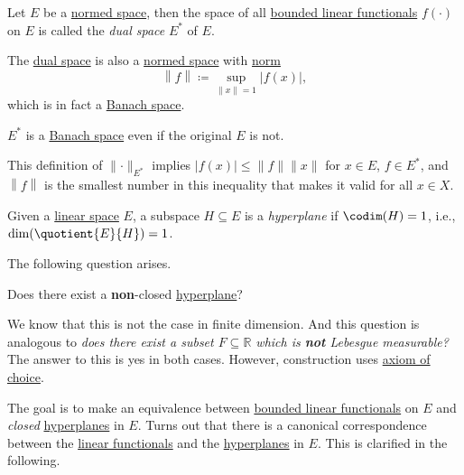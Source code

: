 \begin{definition}\label{def:dual-space}
	Let \(E\) be a \hyperref[def:normed-vector-space]{normed space}, then the space of all \hyperref[def:bounded-linear-functional]{bounded linear functionals} \(f(\cdot)\) on \(E\) is called the \emph{dual space} \(E^{\ast} \) of \(E\).
\end{definition}

The \hyperref[def:dual-space]{dual space} is also a \hyperref[def:normed-vector-space]{normed space} with \hyperref[def:norm]{norm}
\[
	\left\lVert f\right\rVert \coloneqq \sup _{\left\lVert x\right\rVert = 1}\left\vert f(x) \right\vert,
\]
which is in fact a \hyperref[def:Banach-space]{Banach space}.

\begin{remark}
	\(E^{\ast} \) is a \hyperref[def:Banach-space]{Banach space} even if the original \(E\) is not.
\end{remark}

This definition of \(\lVert \cdot \rVert _{E^{\ast} }\) implies \(\vert f(x) \vert \leq \lVert f \rVert \lVert x \rVert\) for \(x\in E\), \(f\in E^{\ast} \), and \(\left\lVert f\right\rVert \) is the smallest number in this inequality that makes it valid for all \(x\in X\).

\begin{definition}[Hyperplane]\label{def:hyperplane}
	Given a \hyperref[def:linear-vector-space]{linear space} \(E\), a subspace \(H\subseteq E\) is a \emph{hyperplane} if \(\codim(H)=1\), i.e., \(\dim (\quotient{E}{H})=1\).
\end{definition}

The following question arises.

\begin{problem}
Does there exist a \textbf{non}-closed \hyperref[def:hyperplane]{hyperplane}?
\end{problem}
\begin{answer}
	We know that this is not the case in finite dimension. And this question is analogous to \emph{does there exist a subset \(F\subseteq \mathbb{R} \) which is \textbf{not} Lebesgue measurable?} The answer to this is yes in both cases. However, construction uses \href{https://en.wikipedia.org/wiki/Axiom_of_choice}{axiom of choice}.
\end{answer}

The goal is to make an equivalence between \hyperref[def:bounded-linear-functional]{bounded linear functionals} on \(E\) and \emph{closed} \hyperref[def:hyperplane]{hyperplanes} in \(E\). Turns out that there is a canonical correspondence between the \hyperref[def:linear-functional]{linear functionals} and the \hyperref[def:hyperplane]{hyperplanes} in \(E\). This is clarified in the following.

